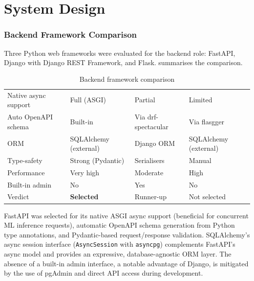 \chapter{System Design}
\label{chap:design}
\setlength{\parskip}{1em}

\subsection{Backend Framework Comparison}
 
Three Python web frameworks were evaluated for the backend role:
FastAPI, Django with Django REST Framework, and Flask.
 summarises the comparison.
 
\begin{table}[H]
  \centering
  \caption{Backend framework comparison}
  \label{tab:frameworkcomp}
  \begin{tabularx}{\textwidth}{@{}L{3.2cm} L{2.8cm} L{2.8cm} L{2.8cm}@{}}
    \toprule
     &  &  &
     \\
    \midrule
    Native async support & Full (ASGI) & Partial & Limited \\
    Auto OpenAPI schema  & Built-in    & Via drf-spectacular & Via flasgger \\
    ORM                  & SQLAlchemy (external) & Django ORM & SQLAlchemy (external) \\
    Type-safety          & Strong (Pydantic) & Serialisers & Manual \\
    Performance          & Very high   & Moderate    & High \\
    Built-in admin       & No          & Yes         & No \\
    Verdict              & \textbf{Selected} & Runner-up & Not selected \\
    \bottomrule
  \end{tabularx}
\end{table}

FastAPI was selected for its native ASGI async support (beneficial for
concurrent ML inference requests), automatic OpenAPI schema generation
from Python type annotations, and Pydantic-based request/response
validation. SQLAlchemy's async session interface
(\texttt{AsyncSession} with \texttt{asyncpg}) complements FastAPI's async
model and provides an expressive, database-agnostic ORM layer. The absence
of a built-in admin interface, a notable advantage of Django, is mitigated
by the use of pgAdmin and direct API access during development.

